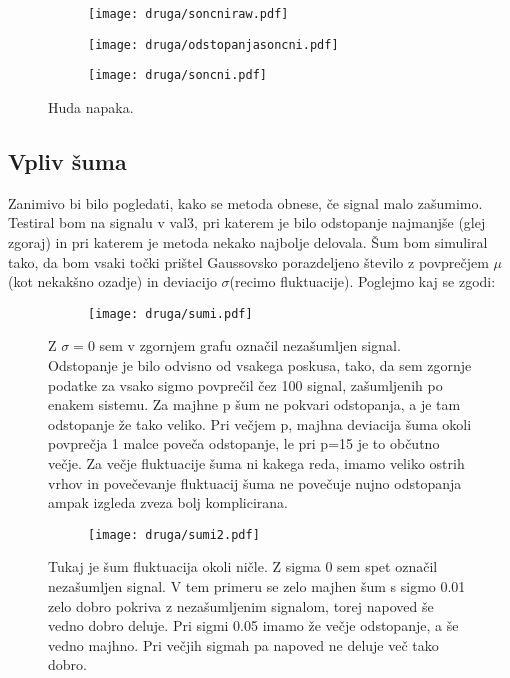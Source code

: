 \documentclass{article}
\begin{document}
\begin{figure}[H]
\centering
\begin{subfigure}{.75\textwidth}
\texttt{[image: druga/soncniraw.pdf]}
\end{subfigure}
\caption*{}
\end{figure}

\begin{figure}[H]
\centering
\begin{subfigure}{.49\textwidth}
\texttt{[image: druga/odstopanjasoncni.pdf]}
\end{subfigure}
\begin{subfigure}{.49\textwidth}
\texttt{[image: druga/soncni.pdf]}
\end{subfigure}
\caption*{Huda napaka.}
\end{figure}


\subsection{Vpliv šuma}
Zanimivo bi bilo pogledati, kako se metoda obnese, če signal malo zašumimo. Testiral bom na signalu v val3, pri katerem je bilo odstopanje najmanjše (glej zgoraj) in pri katerem je metoda nekako najbolje delovala. Šum bom simuliral tako, da bom vsaki točki prištel Gaussovsko porazdeljeno število z povprečjem $\mu$(kot nekakšno ozadje) in deviacijo $\sigma$(recimo fluktuacije). Poglejmo kaj se zgodi:

\begin{figure}[H]
\centering
\begin{subfigure}{.75\textwidth}
\texttt{[image: druga/sumi.pdf]}
\end{subfigure}
\caption*{Z $\sigma=0$ sem v zgornjem grafu označil nezašumljen signal. Odstopanje je bilo odvisno od vsakega poskusa, tako, da sem zgornje podatke za vsako sigmo povprečil čez 100 signal, zašumljenih po enakem sistemu. Za majhne p šum ne pokvari odstopanja, a je tam odstopanje že tako veliko. Pri večjem p, majhna deviacija šuma okoli povprečja 1 malce poveča odstopanje, le pri p=15 je to občutno večje. Za večje fluktuacije šuma ni kakega reda, imamo veliko ostrih vrhov in povečevanje fluktuacij šuma ne povečuje nujno odstopanja ampak izgleda zveza bolj komplicirana.}
\end{figure}

\begin{figure}[H]
\centering
\begin{subfigure}{.75\textwidth}
\texttt{[image: druga/sumi2.pdf]}
\end{subfigure}
\caption*{Tukaj je šum fluktuacija okoli ničle. Z sigma 0 sem spet označil nezašumljen signal. V tem primeru se zelo majhen šum s sigmo 0.01 zelo dobro pokriva z nezašumljenim signalom, torej napoved še vedno dobro deluje. Pri sigmi 0.05 imamo že večje odstopanje, a še vedno majhno. Pri večjih sigmah pa napoved ne deluje več tako dobro.}
\end{figure}
\end{document}
